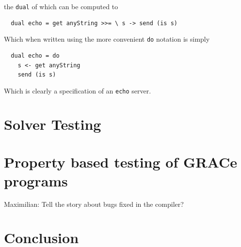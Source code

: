\documentclass{article}
\begin{document}
the \texttt{dual} of which can be computed to

\begin{verbatim}
  dual echo = get anyString >>= \ s -> send (is s)
\end{verbatim}

Which when written using the more convenient \texttt{do} notation is simply

\begin{verbatim}
  dual echo = do
    s <- get anyString
    send (is s)
\end{verbatim}

Which is clearly a specification of an \texttt{echo} server.

\section{Solver Testing}



\section{Property based testing of GRACe programs}

Maximilian: Tell the story about bugs fixed in the compiler?



\section{Conclusion}
\end{document}

